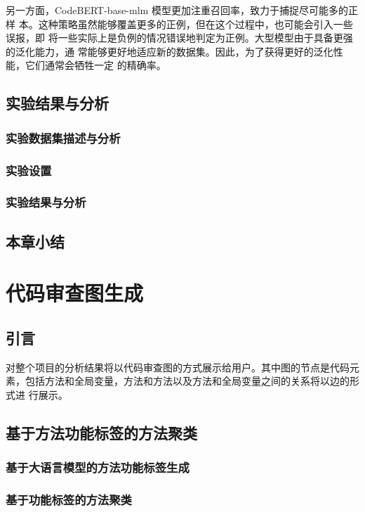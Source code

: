 另一方面，CodeBERT-base-mlm 模型更加注重召回率，致力于捕捉尽可能多的正样
本。这种策略虽然能够覆盖更多的正例，但在这个过程中，也可能会引入一些误报，即
将一些实际上是负例的情况错误地判定为正例。大型模型由于具备更强的泛化能力，通
常能够更好地适应新的数据集。因此，为了获得更好的泛化性能，它们通常会牺牲一定
的精确率。

\section{实验结果与分析}

\subsection{实验数据集描述与分析}
\subsection{实验设置}
\subsection{实验结果与分析}

\section{本章小结}



\chapter{代码审查图生成}
\section{引言}
对整个项目的分析结果将以代码审查图的方式展示给用户。其中图的节点是代码元
素，包括方法和全局变量，方法和方法以及方法和全局变量之间的关系将以边的形式进
行展示。

\section{基于方法功能标签的方法聚类}
\subsection{基于大语言模型的方法功能标签生成}
\subsection{基于功能标签的方法聚类}

